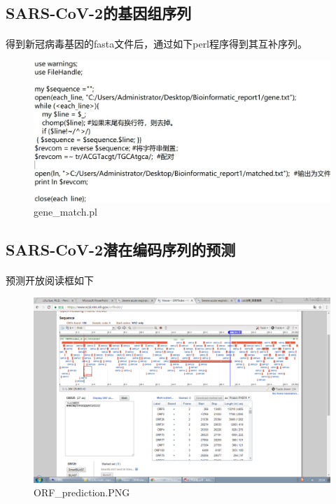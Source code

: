 \documentclass[supercite]{HustGraduPaper}
\begin{document}
	\subsection{SARS-CoV-2的基因组序列}
	\paragraph{}\label{subpara:subpara}得到新冠病毒基因的fasta文件后，通过如下perl程序得到其互补序列。
	\begin{figure}[H]
		\centering
		\includegraphics{./material/practice1/perl_2.jpg}
		\caption{gene\_match.pl}
	\end{figure}

  \subsection{SARS-CoV-2潜在编码序列的预测}
	\paragraph{}\label{subpara:subpara}预测开放阅读框如下
	\begin{figure}[H]
		\centering
		\includegraphics[width=1\textwidth]{./material/practice1/ORF.PNG}
    \caption{ORF\_prediction.PNG}
  \end{figure}
\end{document}
